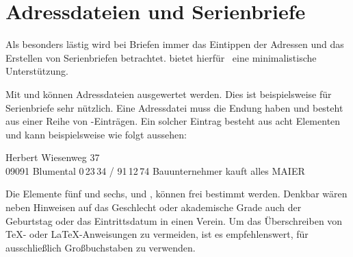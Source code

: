\section{Adressdateien und Serienbriefe}
%
\BeginIndexGroup
{}%

Als besonders lästig wird bei Briefen immer das Eintippen der Adressen und das
Erstellen von Serienbriefen betrachtet. \KOMAScript{} bietet
hierfür%
\iffalse%
  , wie schon die obsolete Klasse \Class{scrlettr},%
\fi%
\ eine minimalistische Unterstützung.%
\iffalse%
  \ Eine stark verbesserte Serienbrief"|funktion ist bereits seit längerem in
  Planung.%
\fi

\begin{Declaration}
\end{Declaration}
Mit  und  können
Adressdateien ausgewertet werden. Dies ist
beispielsweise für Serienbriefe sehr nützlich. Eine Adressdatei muss
die Endung  haben und besteht aus einer Reihe von
-Einträgen. Ein solcher Eintrag besteht aus acht
Elementen und kann beispielsweise wie folgt aussehen:
\begin{lstcode}
           {Herbert}
           {Wiesenweg 37\\ 09091 Blumental}
           {0\,23\,34 / 91\,12\,74}
           {Bauunternehmer}
           {}
           {kauft alles}
           {MAIER}
\end{lstcode}
Die Elemente fünf und sechs,  und , können frei
bestimmt werden. Denkbar wären neben Hinweisen auf das Geschlecht oder
akademische Grade auch der Geburtstag oder das Eintrittsdatum in einen
Verein.  Um das Überschreiben von \TeX- oder \LaTeX-Anweisungen zu
vermeiden, ist es empfehlenswert, für  ausschließlich
Großbuchstaben zu verwenden.

